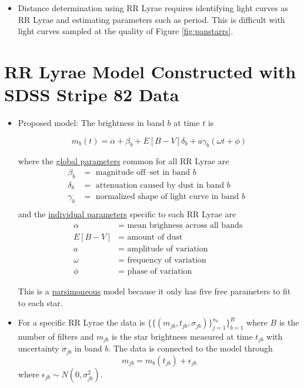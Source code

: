 \documentclass[a0,portrait]{a0poster}
\begin{document}
\begin{multicols}{2}
\begin{itemize}
\item Distance determination using RR Lyrae requires identifying light curves as RR Lyrae and estimating parameters such as period. This is difficult with light curves sampled at the quality of Figure \ref{fig:panstarrs}.


\end{itemize}


\section*{RR Lyrae Model Constructed with SDSS Stripe 82 Data}

\begin{itemize}
\item Proposed model: The brightness in band $b$ at time $t$ is

{\Large
\begin{equation*}
m_b(t) = \alpha + \beta_b + E[B-V]\delta_b + a\gamma_b(\omega t + \phi)
\end{equation*}
}

where the \underline{global parameters} common for all RR Lyrae are
\begin{align*}
\beta_b &=  \text{ magnitude off--set in band $b$ }\\
\delta_b &= \text{ attenuation caused by dust in band $b$ }\\
\gamma_b &= \text{ normalized shape of light curve in band $b$ }\\
\end{align*}
and the \underline{individual parameters} specific to each RR Lyrae are
\begin{align*}
\alpha &= \text{ mean brighness across all bands }\\
E[B-V] &= \text{ amount of dust }\\
a &= \text{ amplitude of variation }\\
\omega &= \text{ frequency of variation }\\
\phi &= \text{ phase of variation }
\end{align*}

This is a \underline{parsimoneous} model because it only has five free parameters to fit to each star.

\item For a specific RR Lyrae the data is $\{\{(m_{jb},t_{jb},\sigma_{jb})\}_{j=1}^{n_b}\}_{b=1}^B$ where $B$ is the number of filters and $m_{jb}$ is the star brightness measured at time $t_{jb}$ with uncertainty $\sigma_{jb}$ in band $b$. The data is connected to the model through
\begin{equation*}
m_{jb} = m_b(t_{jb}) + \epsilon_{jb}
\end{equation*}
where $\epsilon_{jb} \sim N(0,\sigma_{jb}^2)$. 


\end{itemize}
\end{multicols}
\end{document}
